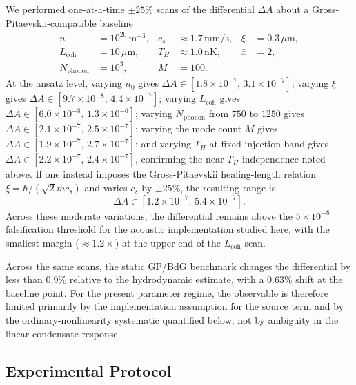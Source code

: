 \documentclass[aps,prd,twocolumn,superscriptaddress,nofootinbib,floatfix]{revtex4-2}
\begin{document}
We performed one-at-a-time $\pm25\%$ scans of the differential $\Delta A$ about a Gross-Pitaevskii-compatible baseline
\begin{align}
    n_0 &= 10^{20}\,\mathrm{m^{-3}}, &
    c_s &\approx 1.7\,\mathrm{mm/s}, &
    \xi &= 0.3\,\mu\mathrm{m}, \nonumber\\
    L_{\mathrm{coh}} &= 10\,\mu\mathrm{m}, &
    T_H &\approx 1.0\,\mathrm{nK}, &
    \bar{x} &= 2, \nonumber\\
    N_{\mathrm{phonon}} &= 10^3, &
    M &= 100. &&
\end{align}
At the ansatz level, varying $n_0$ gives $\Delta A \in [1.8\times10^{-7},\,3.1\times10^{-7}]$; varying $\xi$ gives $\Delta A \in [9.7\times10^{-8},\,4.4\times10^{-7}]$; varying $L_{\mathrm{coh}}$ gives $\Delta A \in [6.0\times10^{-8},\,1.3\times10^{-6}]$; varying $N_{\mathrm{phonon}}$ from $750$ to $1250$ gives $\Delta A \in [2.1\times10^{-7},\,2.5\times10^{-7}]$; varying the mode count $M$ gives $\Delta A \in [1.9\times10^{-7},\,2.7\times10^{-7}]$; and varying $T_H$ at fixed injection band gives $\Delta A \in [2.2\times10^{-7},\,2.4\times10^{-7}]$, confirming the near-$T_H$-independence noted above. If one instead imposes the Gross-Pitaevskii healing-length relation $\xi=\hbar/(\sqrt{2}mc_s)$ and varies $c_s$ by $\pm25\%$, the resulting range is
\begin{equation}
    \Delta A \in [1.2\times10^{-7},\,5.4\times10^{-7}] .
\end{equation}
Across these moderate variations, the differential remains above the $5\times10^{-8}$ falsification threshold for the acoustic implementation studied here, with the smallest margin ($\approx1.2\times$) at the upper end of the $L_{\mathrm{coh}}$ scan.

Across the same scans, the static GP/BdG benchmark changes the differential by less than $0.9\%$ relative to the hydrodynamic estimate, with a $0.63\%$ shift at the baseline point. For the present parameter regime, the observable is therefore limited primarily by the implementation assumption for the source term and by the ordinary-nonlinearity systematic quantified below, not by ambiguity in the linear condensate response.

\subsection{Experimental Protocol}
\end{document}
